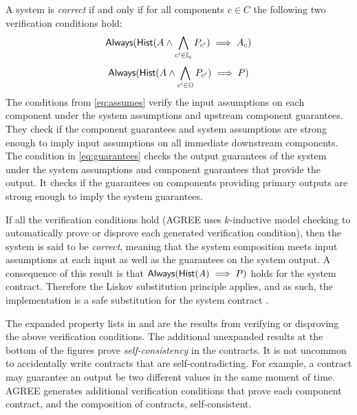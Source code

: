A system is
\emph{correct} if and only if for all components $c \in C$ the
following two verification conditions hold:
\begin{equation}\label{eq:assumes}
            \mathsf{Always}(\mathsf{Hist}(A \wedge
            \bigwedge_{c^\prime \in \mathbb{I}_{c}} P_{c^\prime})
            \implies A_{c})
\end{equation}
\begin{equation}\label{eq:guarantees}
            \mathsf{Always}(\mathsf{Hist}(A \wedge
            \bigwedge_{c^\prime \in \mathbb{O}} P_{c^\prime})
            \implies P)
\end{equation}
The conditions from \eqref{eq:assumes} verify the input assumptions on
each component under the system assumptions and upstream component
guarantees.  They check if the component guarantees and system
assumptions are strong enough to imply input assumptions on all
immediate downstream components.  The condition in
\eqref{eq:guarantees} checks the output guarantees of the system under
the system assumptions and component guarantees that provide the
output.  It checks if the guarantees on components providing primary
outputs are strong enough to imply the system guarantees.

If all the verification conditions hold (AGREE uses $k$-inductive
model checking to automatically prove or disprove each generated
verification condition), then the system is said to be \emph{correct},
meaning that the system composition meets input assumptions at each
input as well as the guarantees on the system output. A consequence of
this result is that $\mathsf{Always}(\mathsf{Hist}(A) \implies
P)$ holds for the system contract.
Therefore the Liskov substitution principle applies, and as such, the implementation is a safe substitution for the system contract \cite{10.1145/62139.62141}.

The expanded property lists in  and
 are the results from verifying or
disproving the above verification conditions.  The additional
unexpanded results at the bottom of the figures prove
\emph{self-consistency} in the contracts.  It is not uncommon to
accidentally write contracts that are self-contradicting.  For
example, a contract may guarantee an output be two different values in
the same moment of time.  AGREE generates additional verification
conditions that prove each component contract, and the composition of
contracts, self-consistent.

